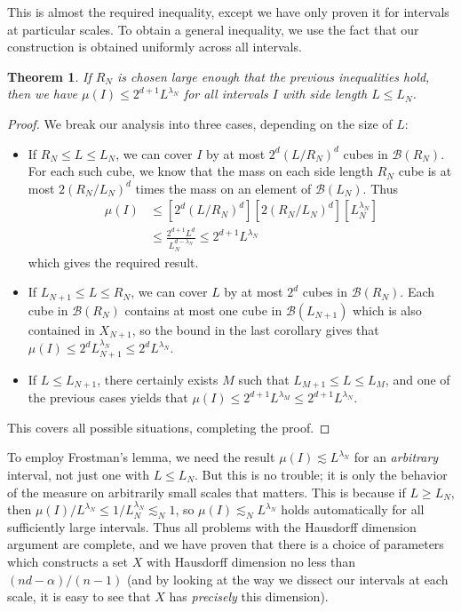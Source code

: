 \documentclass{article}
\theoremstyle{plain}
\theoremstyle{plain}
\newtheorem{theorem}{Theorem}
\begin{document}
\begin{multicols}{2}
This is almost the required inequality, except we have only proven it for intervals at particular scales. To obtain a general inequality, we use the fact that our construction is obtained uniformly across all intervals.

\begin{theorem}
	If $R_N$ is chosen large enough that the previous inequalities hold, then we have $\mu(I) \leq 2^{d+1} L^{\lambda_N}$ for all intervals $I$ with side length $L \leq L_N$.
\end{theorem}
\begin{proof}
	We break our analysis into three cases, depending on the size of $L$:
	\begin{itemize}
		\item If $R_N \leq L \leq L_N$, we can cover $I$ by at most $2^d(L/R_N)^d$ cubes in $\mathcal{B}(R_N)$. For each such cube, we know that the mass on each side length $R_N$ cube is at most $2(R_N/L_N)^d$ times the mass on an element of $\mathcal{B}(L_N)$. Thus
		\begin{align*}
			\mu(I) &\leq [2^d(L/R_N)^d] [2(R_N/L_N)^d] [L_N^{\lambda_N}]\\
			&\leq \frac{2^{d+1} L^d}{L_N^{d - \lambda_N}} \leq 2^{d+1} L^{\lambda_N}
		\end{align*}
		which gives the required result.

		\item If $L_{N+1} \leq L \leq R_N$, we can cover $L$ by at most $2^d$ cubes in $\mathcal{B}(R_N)$. Each cube in $\mathcal{B}(R_N)$ contains at most one cube in $\mathcal{B}(L_{N+1})$ which is also contained in $X_{N+1}$, so the bound in the last corollary gives that $\mu(I) \leq 2^d L_{N+1}^{\lambda_N} \leq 2^d L^{\lambda_N}$.

		\item If $L \leq L_{N+1}$, there certainly exists $M$ such that $L_{M+1} \leq L \leq L_M$, and one of the previous cases yields that $\mu(I) \leq 2^{d+1} L^{\lambda_M} \leq 2^{d+1} L^{\lambda_N}$.
	\end{itemize}
	This covers all possible situations, completing the proof.
\end{proof}

To employ Frostman's lemma, we need the result $\mu(I) \lesssim L^{\lambda_N}$ for an {\it arbitrary} interval, not just one with $L \leq L_N$. But this is no trouble; it is only the behavior of the measure on arbitrarily small scales that matters. This is because if $L \geq L_N$, then $\mu(I)/L^{\lambda_N} \leq 1/L_N^{\lambda_N} \lesssim_N 1$, so $\mu(I) \lesssim_N L^{\lambda_N}$ holds automatically for all sufficiently large intervals. Thus all problems with the Hausdorff dimension argument are complete, and we have proven that there is a choice of parameters which constructs a set $X$ with Hausdorff dimension no less than $(nd - \alpha)/(n-1)$ (and by looking at the way we dissect our intervals at each scale, it is easy to see that $X$ has {\it precisely} this dimension).


\end{multicols}
\end{document}

